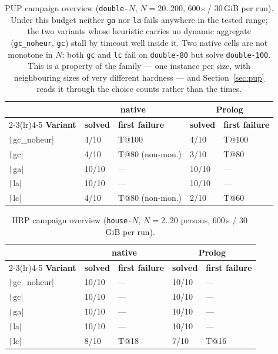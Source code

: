 \begin{table}[H]
\centering
\small
\begin{tabular}{lllll}
\toprule
 & \multicolumn{2}{c}{\textbf{native}} & \multicolumn{2}{c}{\textbf{Prolog}}\\
\cmidrule(lr){2-3}\cmidrule(lr){4-5}
\textbf{Variant} & \textbf{solved} & \textbf{first failure} & \textbf{solved} & \textbf{first failure}\\
\midrule
\texttt|gc_noheur| & 4/10  & T@100 & 4/10  & T@100\\
\texttt|gc|        & 4/10  & T@80 (non-mon.) & 3/10  & T@80\\
\texttt|ga|        & 10/10 & --- & 10/10 & ---\\
\texttt|la|        & 10/10 & --- & 10/10 & ---\\
\texttt|lc|        & 4/10  & T@80 (non-mon.) & 2/10 & T@60\\
\bottomrule
\end{tabular}
\caption{PUP campaign overview (\texttt{double-$N$}, $N=20..200$, 600\,s / 30\,GiB per run). Under this budget neither \texttt{ga} nor \texttt{la} fails anywhere in the tested range; the two variants whose heuristic carries no dynamic aggregate (\texttt{gc\_noheur}, \texttt{gc}) stall by timeout well inside it. Two native cells are not monotone in $N$: both \texttt{gc} and \texttt{lc} fail on \texttt{double-80} but solve \texttt{double-100}. This is a property of the family --- one instance per size, with neighbouring sizes of very different hardness --- and Section~\ref{sec:pup} reads it through the choice counts rather than the times.}
\label{tab:overview-pup}
\end{table}

\begin{table}[H]
\centering
\small
\begin{tabular}{lllll}
\toprule
 & \multicolumn{2}{c}{\textbf{native}} & \multicolumn{2}{c}{\textbf{Prolog}}\\
\cmidrule(lr){2-3}\cmidrule(lr){4-5}
\textbf{Variant} & \textbf{solved} & \textbf{first failure} & \textbf{solved} & \textbf{first failure}\\
\midrule
\texttt|gc_noheur| & 10/10 & --- & 10/10 & ---\\
\texttt|gc|        & 10/10 & --- & 10/10 & ---\\
\texttt|ga|        & 10/10 & --- & 10/10 & ---\\
\texttt|la|        & 10/10 & --- & 10/10 & ---\\
\texttt|lc|        & 8/10  & T@18 & 7/10 & T@16\\
\bottomrule
\end{tabular}
\caption{HRP campaign overview (\texttt{house-$N$}, $N=2..20$ persons, 600\,s / 30\,GiB per run).}
\label{tab:overview-hrp}
\end{table}

